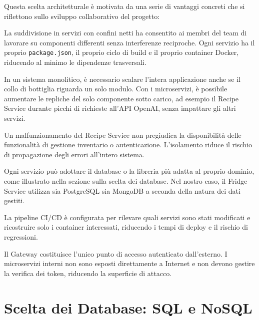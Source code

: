 \documentclass[12pt,a4paper,twoside]{report}
\newenvironment{toollist}{%
  \begin{description}[
    style=nextline,
    leftmargin=0pt,
    labelindent=0pt,
    font=\normalfont\bfseries,
    itemsep=6pt
  ]
}{%
  \end{description}
}
\begin{document}
Questa scelta architetturale è motivata da una serie di vantaggi concreti che si riflettono sullo sviluppo collaborativo del progetto:

\begin{toollist}
  \item[Sviluppo parallelo e indipendente]
    La suddivisione in servizi con confini netti ha consentito ai membri del team di lavorare su componenti differenti senza interferenze reciproche. Ogni servizio ha il proprio \texttt{package.json}, il proprio ciclo di build e il proprio container Docker, riducendo al minimo le dipendenze trasversali.

  \item[Scalabilità selettiva]
    In un sistema monolitico, è necessario scalare l'intera applicazione anche se il collo di bottiglia riguarda un solo modulo. Con i microservizi, è possibile aumentare le repliche del solo componente sotto carico, ad esempio il Recipe Service durante picchi di richieste all'API OpenAI, senza impattare gli altri servizi.

  \item[Isolamento dei guasti]
    Un malfunzionamento del Recipe Service non pregiudica la disponibilità delle funzionalità di gestione inventario o autenticazione. L'isolamento riduce il rischio di propagazione degli errori all'intero sistema.

  \item[Flessibilità tecnologica]
    Ogni servizio può adottare il database o la libreria più adatta al proprio dominio, come illustrato nella sezione sulla scelta dei database. Nel nostro caso, il Fridge Service utilizza sia PostgreSQL sia MongoDB a seconda della natura dei dati gestiti.

  \item[Deploy e aggiornamento indipendenti]
    La pipeline CI/CD è configurata per rilevare quali servizi sono stati modificati e ricostruire solo i container interessati, riducendo i tempi di deploy e il rischio di regressioni.

  \item[Sicurezza per compartimentazione]
    Il Gateway costituisce l'unico punto di accesso autenticato dall'esterno. I microservizi interni non sono esposti direttamente a Internet e non devono gestire la verifica dei token, riducendo la superficie di attacco.
\end{toollist}

\section{Scelta dei Database: SQL e NoSQL}
\end{document}
